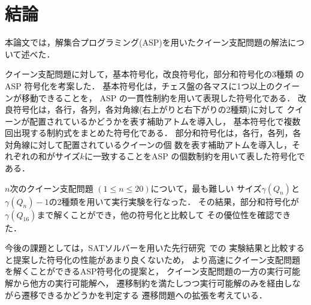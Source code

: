 \chapter{結論}\label{chap:conclusion}

本論文では，解集合プログラミング(ASP)を用いたクイーン支配問題の解法について述べた．

クイーン支配問題に対して，基本符号化，改良符号化，部分和符号化の3種類
の ASP 符号化を考案した．
%
基本符号化は，チェス盤の各マスに1つ以上のクイーンが移動できることを，
ASP の一貫性制約を用いて表現した符号化である．
%
改良符号化は，各行，各列，各対角線(右上がりと右下がりの2種類)に対して
クイーンが配置されているかどうかを表す補助アトムを導入し，
基本符号化で複数回出現する制約式をまとめた符号化である．
%
部分和符号化は，各行，各列，各対角線に対して配置されているクイーンの個
数を表す補助アトムを導入し，それぞれの和がサイズ$k$に一致することをASP
の個数制約を用いて表した符号化である．

$n$次のクイーン支配問題 $(1\leq n\leq 20)$について，最も難しい
サイズ$\gamma(Q_n)$と$\gamma(Q_n)-1$の2種類を用いて実行実験を行なった．
その結果，部分和符号化が$\gamma(Q_{16})$まで解くことができ，他の符号化と比較して
その優位性を確認できた．

今後の課題としては，SATソルバーを用いた先行研究~\cite{yamamoto21}での
実験結果と比較すると提案した符号化の性能があまり良くないため，
より高速にクイーン支配問題を解くことができるASP符号化の提案と，
クイーン支配問題の一方の実行可能解から他方の実行可能解へ，
遷移制約を満たしつつ実行可能解のみを経由しながら遷移できるかどうかを判定する
遷移問題への拡張を考えている．